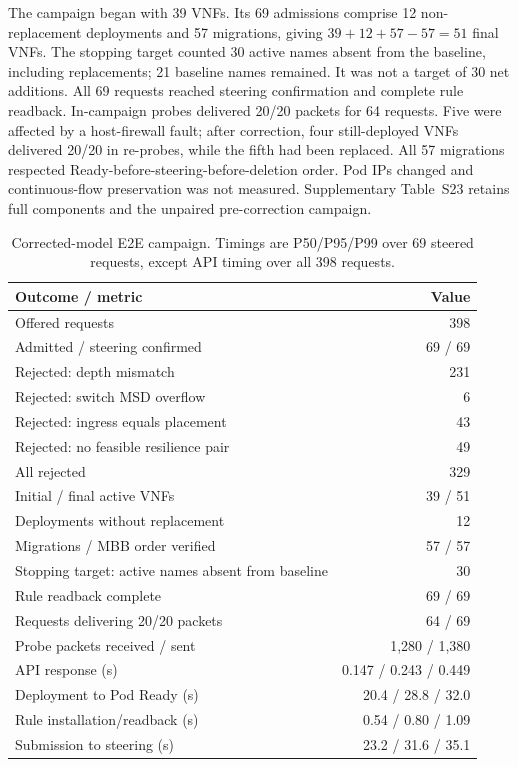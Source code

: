 \documentclass[final,5p]{elsarticle}
\newcommand{\rev}[1]{\textcolor{revisiongreen}{#1}}
\let\newrev\rev
\begin{document}
\newrev{The campaign began with 39 VNFs. Its 69 admissions comprise 12 non-replacement deployments and 57 migrations, giving \(39+12+57-57=51\) final VNFs. The stopping target counted 30 active names absent from the baseline, including replacements; 21 baseline names remained. It was not a target of 30 net additions. All 69 requests reached steering confirmation and complete rule readback. In-campaign probes delivered 20/20 packets for 64 requests. Five were affected by a host-firewall fault; after correction, four still-deployed VNFs delivered 20/20 in re-probes, while the fifth had been replaced. All 57 migrations respected Ready-before-steering-before-deletion order. Pod IPs changed and continuous-flow preservation was not measured. Supplementary Table~S23 retains full components and the unpaired pre-correction campaign.}

\begin{table}[t]
\centering
\caption{\newrev{Corrected-model E2E campaign. Timings are P50/P95/P99 over 69 steered requests, except API timing over all 398 requests.}}
\label{tab:hil_e2e}
{\color{revisiongreen}\footnotesize
\setlength{\tabcolsep}{3pt}
\begin{tabularx}{\columnwidth}{@{}Xr@{}}
\toprule
Outcome / metric & Value \\
\midrule
Offered requests & 398 \\
Admitted / steering confirmed & 69 / 69 \\
Rejected: depth mismatch & 231 \\
Rejected: switch MSD overflow & 6 \\
Rejected: ingress equals placement & 43 \\
Rejected: no feasible resilience pair & 49 \\
All rejected & 329 \\
Initial / final active VNFs & 39 / 51 \\
Deployments without replacement & 12 \\
Migrations / MBB order verified & 57 / 57 \\
Stopping target: active names absent from baseline & 30 \\
Rule readback complete & 69 / 69 \\
Requests delivering 20/20 packets & 64 / 69 \\
Probe packets received / sent & 1,280 / 1,380 \\
API response (s) & 0.147 / 0.243 / 0.449 \\
Deployment to Pod Ready (s) & 20.4 / 28.8 / 32.0 \\
Rule installation/readback (s) & 0.54 / 0.80 / 1.09 \\
Submission to steering (s) & 23.2 / 31.6 / 35.1 \\
\bottomrule
\end{tabularx}}
\end{table}
\end{document}
